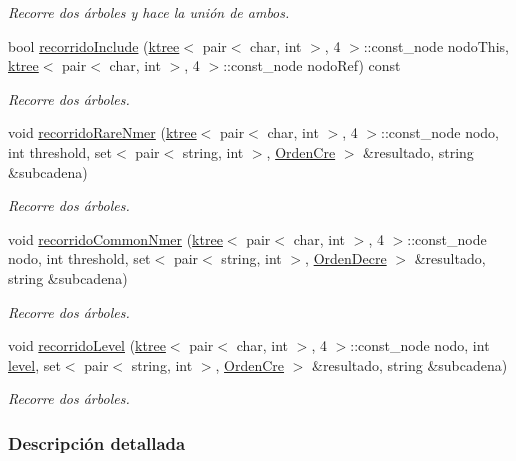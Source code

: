 \begin{DoxyCompactItemize}
\begin{DoxyCompactList}\small\item\em Recorre dos árboles y hace la unión de ambos. \end{DoxyCompactList}\item 
bool \hyperlink{classNmer_ae0ed4de52d43952278583db16f44b6ea}{recorrido\+Include} (\hyperlink{classktree}{ktree}$<$ pair$<$ char, int $>$, 4 $>$\+::const\+\_\+node nodo\+This, \hyperlink{classktree}{ktree}$<$ pair$<$ char, int $>$, 4 $>$\+::const\+\_\+node nodo\+Ref) const 
\begin{DoxyCompactList}\small\item\em Recorre dos árboles. \end{DoxyCompactList}\item 
void \hyperlink{classNmer_a8a013456cde6da2306635a85a3d71f65}{recorrido\+Rare\+Nmer} (\hyperlink{classktree}{ktree}$<$ pair$<$ char, int $>$, 4 $>$\+::const\+\_\+node nodo, int threshold, set$<$ pair$<$ string, int $>$, \hyperlink{classOrdenCre}{Orden\+Cre} $>$ \&resultado, string \&subcadena)
\begin{DoxyCompactList}\small\item\em Recorre dos árboles. \end{DoxyCompactList}\item 
void \hyperlink{classNmer_a2bb9a1b953d3600c296b4fdb3be6c919}{recorrido\+Common\+Nmer} (\hyperlink{classktree}{ktree}$<$ pair$<$ char, int $>$, 4 $>$\+::const\+\_\+node nodo, int threshold, set$<$ pair$<$ string, int $>$, \hyperlink{classOrdenDecre}{Orden\+Decre} $>$ \&resultado, string \&subcadena)
\begin{DoxyCompactList}\small\item\em Recorre dos árboles. \end{DoxyCompactList}\item 
void \hyperlink{classNmer_a6cc25139fb516f7633fddc96b21fe716}{recorrido\+Level} (\hyperlink{classktree}{ktree}$<$ pair$<$ char, int $>$, 4 $>$\+::const\+\_\+node nodo, int \hyperlink{classNmer_a97de70ffe49a0457e87ed249251b9c14}{level}, set$<$ pair$<$ string, int $>$, \hyperlink{classOrdenCre}{Orden\+Cre} $>$ \&resultado, string \&subcadena)
\begin{DoxyCompactList}\small\item\em Recorre dos árboles. \end{DoxyCompactList}\end{DoxyCompactItemize}


\subsubsection{Descripción detallada}


